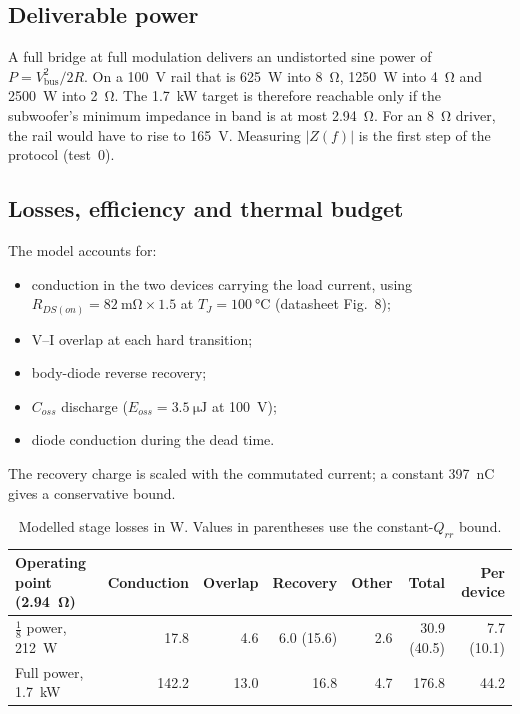 \documentclass[10pt,a4paper]{article}
\begin{document}
\subsection{Deliverable power}
A full bridge at full modulation delivers an undistorted sine power of $P=V_\mathrm{bus}^2/2R$. On a \SI{100}{\volt} rail that is \SI{625}{\watt} into \SI{8}{\ohm}, \SI{1250}{\watt} into \SI{4}{\ohm} and \SI{2500}{\watt} into \SI{2}{\ohm}. The \SI{1.7}{\kilo\watt} target is therefore reachable only if the subwoofer's minimum impedance in band is at most \SI{2.94}{\ohm}. For an \SI{8}{\ohm} driver, the rail would have to rise to \SI{165}{\volt}. Measuring $|Z(f)|$ is the first step of the protocol (test~0).

\subsection{Losses, efficiency and thermal budget}
The model accounts for:
\begin{itemize}
\item conduction in the two devices carrying the load current, using $R_{DS(on)}=\SI{82}{\milli\ohm}\times1.5$ at $T_J=\SI{100}{\celsius}$ (datasheet Fig.~8);
\item V--I overlap at each hard transition;
\item body-diode reverse recovery;
\item $C_{oss}$ discharge ($E_{oss}=\SI{3.5}{\micro\joule}$ at \SI{100}{\volt});
\item diode conduction during the dead time.
\end{itemize}
The recovery charge is scaled with the commutated current; a constant \SI{397}{\nano\coulomb} gives a conservative bound.

\begin{table}[h]\centering\small
\begin{tabular}{lrrrrrr}\toprule
Operating point (\SI{2.94}{\ohm}) & Conduction & Overlap & Recovery & Other & Total & Per device\\\midrule
$\tfrac18$ power, \SI{212}{\watt} & 17.8 & 4.6 & 6.0 (15.6) & 2.6 & 30.9 (40.5) & 7.7 (10.1)\\
Full power, \SI{1.7}{\kilo\watt} & 142.2 & 13.0 & 16.8 & 4.7 & 176.8 & 44.2\\\bottomrule
\end{tabular}
\caption{Modelled stage losses in W. Values in parentheses use the constant-$Q_{rr}$ bound.}\label{tab:loss}
\end{table}
\end{document}
